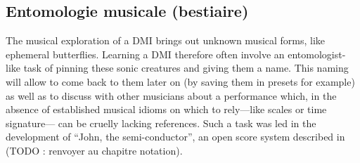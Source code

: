 \subsection{Entomologie musicale (bestiaire)}
The musical exploration of a DMI brings out unknown musical forms, like ephemeral butterflies. Learning a DMI therefore often involve an entomologist-like task of pinning these sonic creatures and giving them a name. This naming will allow to come back to them later on (by saving them in presets for example) as well as to discuss with other musicians about a performance which, in the absence of established musical idioms on which to rely—like scales or time signature— can be cruelly lacking references. Such a task was led in the development of “John, the semi-conductor”, an open score system described in \cite{goudard_john_2018} (TODO : renvoyer au chapitre notation).


